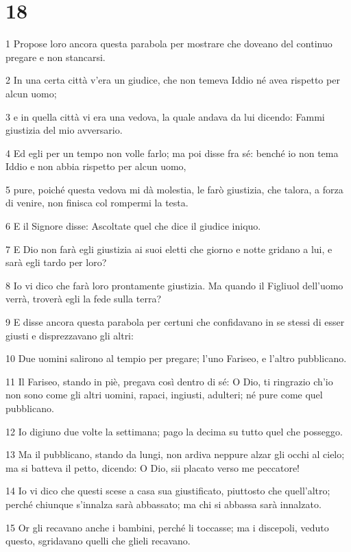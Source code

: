 \chapter{18}

\par 1 Propose loro ancora questa parabola per mostrare che doveano del continuo pregare e non stancarsi.
\par 2 In una certa città v'era un giudice, che non temeva Iddio né avea rispetto per alcun uomo;
\par 3 e in quella città vi era una vedova, la quale andava da lui dicendo: Fammi giustizia del mio avversario.
\par 4 Ed egli per un tempo non volle farlo; ma poi disse fra sé: benché io non tema Iddio e non abbia rispetto per alcun uomo,
\par 5 pure, poiché questa vedova mi dà molestia, le farò giustizia, che talora, a forza di venire, non finisca col rompermi la testa.
\par 6 E il Signore disse: Ascoltate quel che dice il giudice iniquo.
\par 7 E Dio non farà egli giustizia ai suoi eletti che giorno e notte gridano a lui, e sarà egli tardo per loro?
\par 8 Io vi dico che farà loro prontamente giustizia. Ma quando il Figliuol dell'uomo verrà, troverà egli la fede sulla terra?
\par 9 E disse ancora questa parabola per certuni che confidavano in se stessi di esser giusti e disprezzavano gli altri:
\par 10 Due uomini salirono al tempio per pregare; l'uno Fariseo, e l'altro pubblicano.
\par 11 Il Fariseo, stando in piè, pregava così dentro di sé: O Dio, ti ringrazio ch'io non sono come gli altri uomini, rapaci, ingiusti, adulteri; né pure come quel pubblicano.
\par 12 Io digiuno due volte la settimana; pago la decima su tutto quel che posseggo.
\par 13 Ma il pubblicano, stando da lungi, non ardiva neppure alzar gli occhi al cielo; ma si batteva il petto, dicendo: O Dio, sii placato verso me peccatore!
\par 14 Io vi dico che questi scese a casa sua giustificato, piuttosto che quell'altro; perché chiunque s'innalza sarà abbassato; ma chi si abbassa sarà innalzato.
\par 15 Or gli recavano anche i bambini, perché li toccasse; ma i discepoli, veduto questo, sgridavano quelli che glieli recavano.

